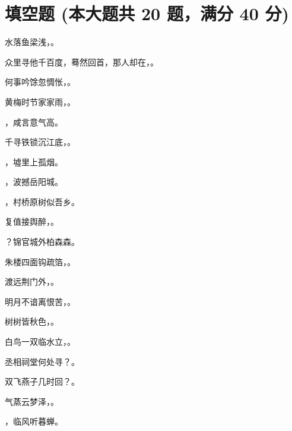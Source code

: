 \documentclass[12pt, a4paper, addpoints]{exam}
\begin{document}
\pagestyle{headandfoot}

\begin{center}
\end{center}
\vspace{5mm}

\normalsize
\vspace{5mm}

\section{\normalsize{填空题 (本大题共 20 题，满分 40 分)}}
\hspace{1.5cm}
\begin{questions}
\question[2] 水落鱼梁浅，\uline{\qquad\qquad\qquad\qquad}。

\question[2] 众里寻他千百度，蓦然回首，那人却在，\uline{\qquad\qquad\qquad\qquad}。

\question[2] 何事吟馀忽惆怅，\uline{\qquad\qquad\qquad\qquad}。

\question[2] 黄梅时节家家雨，\uline{\qquad\qquad\qquad\qquad}。

\question[2] \uline{\qquad\qquad\qquad\qquad}，咸言意气高。

\question[2] 千寻铁锁沉江底，\uline{\qquad\qquad\qquad\qquad}。

\question[2] \uline{\qquad\qquad\qquad\qquad}，墟里上孤烟。

\question[2] \uline{\qquad\qquad\qquad\qquad}，波撼岳阳城。

\question[2] \uline{\qquad\qquad\qquad\qquad}，村桥原树似吾乡。

\question[2] 复值接舆醉，\uline{\qquad\qquad\qquad\qquad}。

\question[2] \uline{\qquad\qquad\qquad\qquad}？锦官城外柏森森。

\question[2] 朱楼四面钩疏箔，\uline{\qquad\qquad\qquad\qquad}。

\question[2] 渡远荆门外，\uline{\qquad\qquad\qquad\qquad}。

\question[2] 明月不谙离恨苦，\uline{\qquad\qquad\qquad\qquad}。

\question[2] 树树皆秋色，\uline{\qquad\qquad\qquad\qquad}。

\question[2] 白鸟一双临水立，\uline{\qquad\qquad\qquad\qquad}。

\question[2] 丞相祠堂何处寻？\uline{\qquad\qquad\qquad\qquad}。

\question[2] 双飞燕子几时回？\uline{\qquad\qquad\qquad\qquad}。

\question[2] 气蒸云梦泽，\uline{\qquad\qquad\qquad\qquad}。

\question[2] \uline{\qquad\qquad\qquad\qquad}，临风听暮蝉。

\end{questions}
\end{document}
